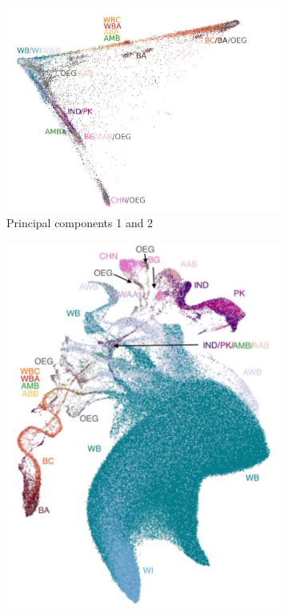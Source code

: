 \documentclass[12pt]{pnas-new}
\begin{document}
\begin{figure}%
\centering
\begin{subfigure}{.5\columnwidth}
\includegraphics[width=\columnwidth]{images/UKBB_PC0_PC1_eth_crop.jpeg}%
\caption{Principal components 1 and 2}%
\label{fig:pc_ukbb}%
\end{subfigure}\hfill%
\begin{subfigure}{.5\columnwidth}
\includegraphics[width=\columnwidth]{images/UKBB_UMAP_PC10_NN15_MD05_eth_labels.pdf}%

\end{subfigure}
\end{figure}
\end{document}
